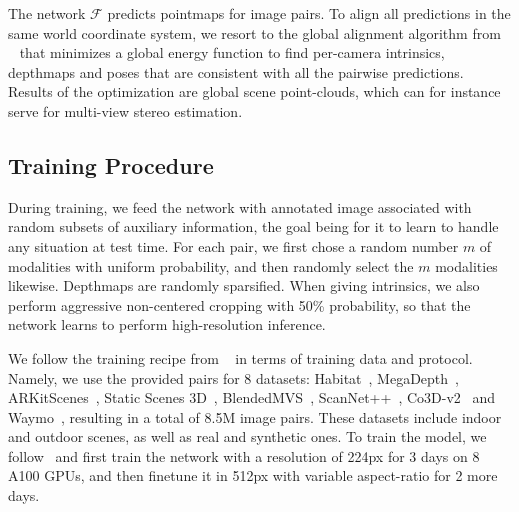 The network $\mathcal{F}$ predicts pointmaps for image pairs.
To align all predictions in the same world coordinate system, we resort to the global alignment algorithm from \duster{}~\cite{wang2024dust3r} 
that minimizes a global energy function to find per-camera intrinsics, depthmaps and poses that are consistent with all the pairwise predictions.
Results of the optimization are global scene point-clouds, which can for instance serve for multi-view stereo estimation. %

    






\subsection{Training Procedure}

During training, we feed the network with annotated image  associated with random subsets of auxiliary information, the goal being for it to learn to handle any situation at test time.
For each pair, we first chose a random number $m$ of 
 modalities with uniform probability, and then randomly select the $m$ modalities likewise.
Depthmaps are randomly sparsified. %
When giving intrinsics, we also perform aggressive non-centered cropping with 50\% probability, so that the network learns to perform high-resolution inference. %

We follow the training recipe from \duster{}~\cite{wang2024dust3r} in terms of training data and protocol.
Namely, we use the provided pairs for 8 datasets: Habitat~\cite{savva2019habitat}, MegaDepth~\cite{li2018megadepth}, ARKitScenes~\cite{baruch2021arkitscenes}, Static Scenes 3D~\cite{mayer2016large}, BlendedMVS~\cite{yao2020blendedmvs}, ScanNet++~\cite{yeshwanth2023scannet++}, Co3D-v2~\cite{reizenstein2021common} and Waymo~\cite{sun2020scalability}, resulting in a total of 8.5M image pairs.
These datasets include indoor and outdoor scenes, as well as real and synthetic ones.
To train the model, we follow~\cite{wang2024dust3r} and first train the network with a resolution of 224px for 3 days on 8 A100 GPUs, and then finetune it in 512px with variable aspect-ratio for 2 more days.

